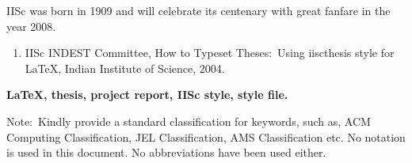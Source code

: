 \begin{frontmatter}
\vita
IISc was born in 1909 and will celebrate its centenary with great fanfare
in the year 2008.
\publications

\begin{enumerate}
\item IISc INDEST Committee,  How to Typeset Theses:~Using iiscthesis
style for \LaTeX, Indian Institute of Science, 2004.
\end{enumerate}

\begin{abstract}
\sl
	This manual tells   you how  to use the  {\tt iiscthes} style to
produce professional  theses (Ph.D., M.Sc.(Engg)  or  M.E.   reports).
This style is a modification of the  standard \LaTeX\ report style. 
This document is written using the {\tt iiscthes} style itself.
	
\end{abstract}

\makecontents

\keywords
{\large\bf{
LaTeX, thesis, project report, IISc style, style file.
}}

\vspace{10MM}

\noindent
Note:~Kindly provide a standard classification for keywords, such as,
ACM Computing Classification, JEL Classification, AMS Classification etc.
\notations
	No notation is used in this document. No abbreviations have been
used either.
\end{frontmatter}
